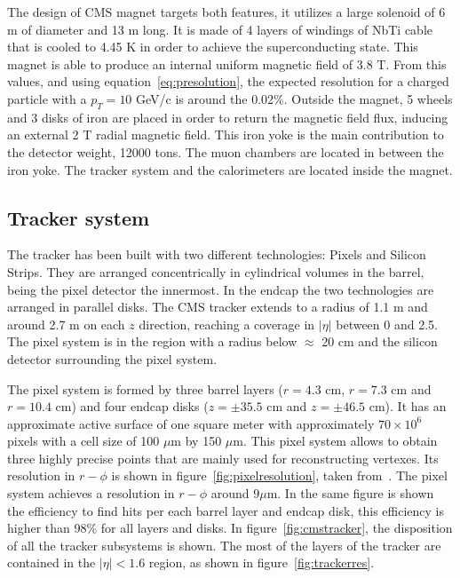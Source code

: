 The design of CMS magnet targets both features, it utilizes a large solenoid of 6 m of diameter and 13 m long. It is made of 4 layers of windings of NbTi cable that is cooled to 4.45 K in order to achieve the superconducting state. This magnet is able to produce an internal uniform magnetic field of 3.8 T. From this values, and using equation~\ref{eq:presolution}, the expected resolution for a charged particle with a $p_{T}=10$ GeV/c is around the 0.02\%. Outside the magnet, 5 wheels and 3 disks of iron are placed in order to return the magnetic field flux, inducing an external 2 T radial magnetic field. This iron yoke is the main contribution to the detector weight, 12000 tons. The muon chambers are located in between the iron yoke. The tracker system and the calorimeters are located inside the magnet. 

\subsection{Tracker system}
\label{sec:tracker}

The tracker has been built with two different technologies: Pixels and Silicon Strips. They are arranged concentrically in cylindrical volumes in the barrel, being the pixel detector the innermost. In the endcap the two technologies are arranged in parallel disks. The CMS tracker extends to a radius of 1.1 m and around 2.7 m on each $z$ direction, reaching a coverage in $|\eta|$ between 0 and 2.5. The pixel system is in the region with a radius below $\approx$ 20 cm and the silicon detector surrounding the pixel system. %

The pixel system is formed by three barrel layers ($r=4.3$ cm, $r=7.3$ cm and $r=10.4$ cm) and four endcap disks ($z=\pm 35.5$ cm and $z=\pm 46.5$ cm). It has an approximate active surface of one square meter with approximately $70\times10^{6}$ pixels with a cell size of 100 $\mu$m by 150 $\mu$m. This pixel system allows to obtain three highly precise points that are mainly used for reconstructing vertexes. Its resolution in $r-\phi$ is shown in figure~\ref{fig:pixelresolution}, taken from~\cite{Brochet:1956723}. The pixel system achieves a resolution in $r-\phi$ around ${9\mu\text{m}}$. In the same figure is shown the efficiency to find hits per each barrel layer and endcap disk, this efficiency is higher than 98\% for all layers and disks. In figure~\ref{fig:cmstracker}, the disposition of all the tracker subsystems is shown. The most of the layers of the tracker are contained in the $|\eta|<1.6$ region, as shown in figure~\ref{fig:trackerres}.

